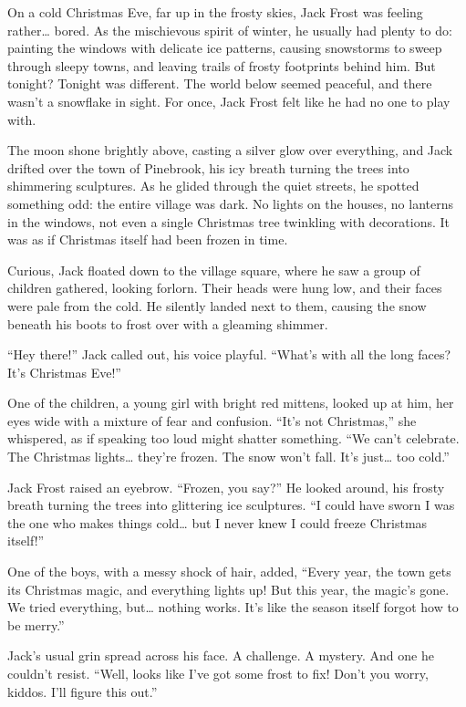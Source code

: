 \documentclass{article}
\begin{document}

On a cold Christmas Eve, far up in the frosty skies, Jack Frost was feeling rather… bored. As the mischievous spirit of winter, he usually had plenty to do: painting the windows with delicate ice patterns, causing snowstorms to sweep through sleepy towns, and leaving trails of frosty footprints behind him. But tonight? Tonight was different. The world below seemed peaceful, and there wasn’t a snowflake in sight. For once, Jack Frost felt like he had no one to play with.

The moon shone brightly above, casting a silver glow over everything, and Jack drifted over the town of Pinebrook, his icy breath turning the trees into shimmering sculptures. As he glided through the quiet streets, he spotted something odd: the entire village was dark. No lights on the houses, no lanterns in the windows, not even a single Christmas tree twinkling with decorations. It was as if Christmas itself had been frozen in time.

Curious, Jack floated down to the village square, where he saw a group of children gathered, looking forlorn. Their heads were hung low, and their faces were pale from the cold. He silently landed next to them, causing the snow beneath his boots to frost over with a gleaming shimmer.

“Hey there!” Jack called out, his voice playful. “What’s with all the long faces? It’s Christmas Eve!”

One of the children, a young girl with bright red mittens, looked up at him, her eyes wide with a mixture of fear and confusion. “It’s not Christmas,” she whispered, as if speaking too loud might shatter something. “We can’t celebrate. The Christmas lights… they’re frozen. The snow won’t fall. It’s just… too cold.”

Jack Frost raised an eyebrow. “Frozen, you say?” He looked around, his frosty breath turning the trees into glittering ice sculptures. “I could have sworn I was the one who makes things cold… but I never knew I could freeze Christmas itself!”

One of the boys, with a messy shock of hair, added, “Every year, the town gets its Christmas magic, and everything lights up! But this year, the magic’s gone. We tried everything, but… nothing works. It’s like the season itself forgot how to be merry.”

Jack’s usual grin spread across his face. A challenge. A mystery. And one he couldn’t resist. “Well, looks like I’ve got some frost to fix! Don’t you worry, kiddos. I’ll figure this out.”
\end{document}
